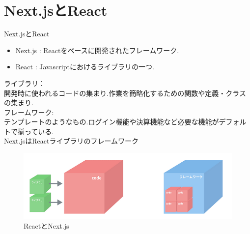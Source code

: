 \documentclass[aspectratio=169]{beamer}
\begin{document}
\section{Next.jsとReact}

\begin{frame}[allowframebreaks]{Next.jsとReact}
    \begin{itemize}
        \setlength{\itemsep}{2em}
        \item Next.js : Reactをベースに開発されたフレームワーク.
        \item React : Javascriptにおけるライブラリの一つ.
    \end{itemize}
    \vspace{2em}
    ライブラリ：\\開発時に使われるコードの集まり.作業を簡略化するための関数や定義・クラスの集まり.\\
    フレームワーク:\\テンプレートのようなもの.ログイン機能や決算機能など必要な機能がデフォルトで揃っている.\\
    \Rightarrow Next.jsはReactライブラリのフレームワーク
    \begin{figure}
        \includegraphics[scale=0.5]{Next.js_and_React.png}
        \caption{ReactとNext.js}
    \end{figure}
\end{frame}
\end{document}

